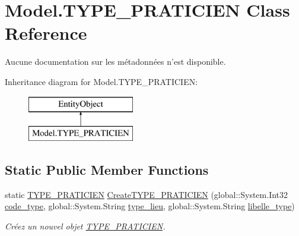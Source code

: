 \hypertarget{class_model_1_1_t_y_p_e___p_r_a_t_i_c_i_e_n}{\section{Model.\-T\-Y\-P\-E\-\_\-\-P\-R\-A\-T\-I\-C\-I\-E\-N Class Reference}
\label{class_model_1_1_t_y_p_e___p_r_a_t_i_c_i_e_n}
}


Aucune documentation sur les métadonnées n'est disponible.  


Inheritance diagram for Model.\-T\-Y\-P\-E\-\_\-\-P\-R\-A\-T\-I\-C\-I\-E\-N\-:\begin{figure}[H]
\begin{center}
\leavevmode
\includegraphics[height=2.000000cm]{class_model_1_1_t_y_p_e___p_r_a_t_i_c_i_e_n}
\end{center}
\end{figure}
\subsection*{Static Public Member Functions}
\begin{DoxyCompactItemize}
\item 
static \hyperlink{class_model_1_1_t_y_p_e___p_r_a_t_i_c_i_e_n}{T\-Y\-P\-E\-\_\-\-P\-R\-A\-T\-I\-C\-I\-E\-N} \hyperlink{class_model_1_1_t_y_p_e___p_r_a_t_i_c_i_e_n_a423394c570eccda7efee370e25887707}{Create\-T\-Y\-P\-E\-\_\-\-P\-R\-A\-T\-I\-C\-I\-E\-N} (global\-::\-System.\-Int32 \hyperlink{class_model_1_1_t_y_p_e___p_r_a_t_i_c_i_e_n_a48244203401f53911cbb4b3981cd6adc}{code\-\_\-type}, global\-::\-System.\-String \hyperlink{class_model_1_1_t_y_p_e___p_r_a_t_i_c_i_e_n_a1763dc779611fa8988840c66d8097bbb}{type\-\_\-lieu}, global\-::\-System.\-String \hyperlink{class_model_1_1_t_y_p_e___p_r_a_t_i_c_i_e_n_ad800514647304706a6b72928af0e16d3}{libelle\-\_\-type})
\begin{DoxyCompactList}\small\item\em Créez un nouvel objet \hyperlink{class_model_1_1_t_y_p_e___p_r_a_t_i_c_i_e_n}{T\-Y\-P\-E\-\_\-\-P\-R\-A\-T\-I\-C\-I\-E\-N}. \end{DoxyCompactList}\end{DoxyCompactItemize}
